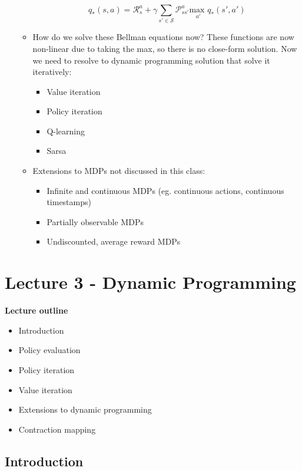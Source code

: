\documentclass{article}
\begin{document}
\begin{itemize}
\begin{itemize}
        \begin{equation}
            q_*(s, a)=\mathcal{R}^a_s+\gamma \sum_{s'\in \mathcal{S}}\mathcal{P}^a_{ss'}\underset{a'}{\text{max }}q_*(s', a')
        \end{equation}
        \item How do we solve these Bellman equations now? These functions are now non-linear due to taking the max, so there is no close-form solution. Now we need to resolve to dynamic programming solution that solve it iteratively:
        \begin{itemize}
            \item Value iteration
            \item Policy iteration
            \item Q-learning
            \item Sarsa
        \end{itemize}
        \item Extensions to MDPs not discussed in this class:
        \begin{itemize}
            \item Infinite and continuous MDPs (eg. continuous actions, continuous timestamps)
            \item Partially observable MDPs
            \item Undiscounted, average reward MDPs
        \end{itemize}
    \end{itemize}
\end{itemize}

\section{Lecture 3 - Dynamic Programming}

\textbf{Lecture outline}
\begin{itemize}
    \item Introduction
    \item Policy evaluation
    \item Policy iteration
    \item Value iteration
    \item Extensions to dynamic programming
    \item Contraction mapping
\end{itemize}

\subsection{Introduction}
\end{document}
